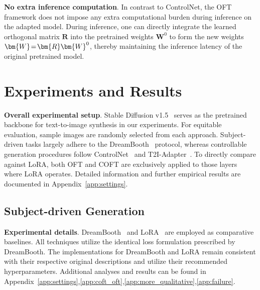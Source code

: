\textbf{No extra inference computation}. In contrast to ControlNet, the OFT framework does not impose any extra computational burden during inference on the adapted model. During inference, one can directly integrate the learned orthogonal matrix $\bm{R}$ into the pretrained weights $\bm{W}^0$ to form the new weights $\thickmuskip=2mu \medmuskip=2mu \bm{W}=\bm{R}\bm{W}^0$, thereby maintaining the inference latency of the original pretrained model.

\section{Experiments and Results}

\textbf{Overall experimental setup}. Stable Diffusion v1.5~\cite{rombach2022high} serves as the pretrained backbone for text-to-image synthesis in our experiments. For equitable evaluation, sample images are randomly selected from each approach. Subject-driven tasks largely adhere to the DreamBooth~\cite{ruiz2023dreambooth} protocol, whereas controllable generation procedures follow ControlNet~\cite{zhang2023adding} and T2I-Adapter~\cite{mou2023t2i}. To directly compare against LoRA, both OFT and COFT are exclusively applied to those layers where LoRA operates. Detailed information and further empirical results are documented in Appendix~\ref{app:settings}.

\subsection{Subject-driven Generation}

\textbf{Experimental details}. DreamBooth~\cite{ruiz2023dreambooth} and LoRA~\cite{hulora2022} are employed as comparative baselines. All techniques utilize the identical loss formulation prescribed by DreamBooth. The implementations for DreamBooth and LoRA remain consistent with their respective original descriptions and utilize their recommended hyperparameters. Additional analyses and results can be found in Appendix~\ref{app:settings},\ref{app:coft_oft},\ref{app:more_qualitative},\ref{app:failure}.

